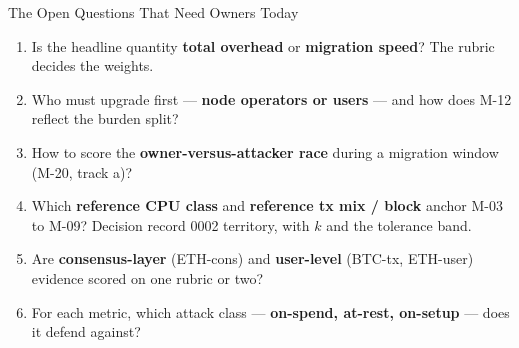 \documentclass[aspectratio=169,10pt]{beamer}
\begin{document}
\begin{frame}{The Open Questions That Need Owners Today}
  \begin{enumerate}\small
    \item Is the headline quantity \textbf{total overhead} or \textbf{migration speed}? The rubric decides the weights.
    \item Who must upgrade first --- \textbf{node operators or users} --- and how does M-12 reflect the burden split?
    \item How to score the \textbf{owner-versus-attacker race} during a migration window (M-20, track a)?
    \item Which \textbf{reference CPU class} and \textbf{reference tx mix / block} anchor M-03 to M-09? Decision record 0002 territory, with $k$ and the tolerance band.
    \item Are \textbf{consensus-layer} (ETH-cons) and \textbf{user-level} (BTC-tx, ETH-user) evidence scored on one rubric or two?
    \item For each metric, which attack class --- \textbf{on-spend, at-rest, on-setup} --- does it defend against?
  \end{enumerate}
\end{frame}
\end{document}
